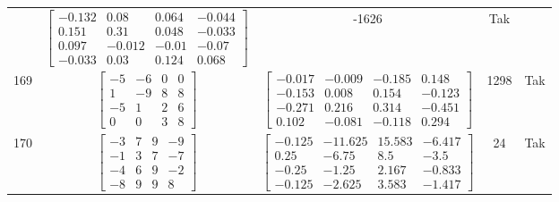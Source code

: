 \documentclass[a4paper,12pt]{article}
\begin{document}
\begin{tabular}{c c c c c}
&
$\begin{bmatrix} -0.132 & 0.08 & 0.064 & -0.044 \\ 0.151 & 0.31 & 0.048 & -0.033 \\ 0.097 & -0.012 & -0.01 & -0.07 \\ -0.033 & 0.03 & 0.124 & 0.068 \end{bmatrix}$
&
-1626
&
Tak
\\
169
&
$\begin{bmatrix} -5 & -6 & 0 & 0 \\ 1 & -9 & 8 & 8 \\ -5 & 1 & 2 & 6 \\ 0 & 0 & 3 & 8 \end{bmatrix}$
&
$\begin{bmatrix} -0.017 & -0.009 & -0.185 & 0.148 \\ -0.153 & 0.008 & 0.154 & -0.123 \\ -0.271 & 0.216 & 0.314 & -0.451 \\ 0.102 & -0.081 & -0.118 & 0.294 \end{bmatrix}$
&
1298
&
Tak
\\
170
&
$\begin{bmatrix} -3 & 7 & 9 & -9 \\ -1 & 3 & 7 & -7 \\ -4 & 6 & 9 & -2 \\ -8 & 9 & 9 & 8 \end{bmatrix}$
&
$\begin{bmatrix} -0.125 & -11.625 & 15.583 & -6.417 \\ 0.25 & -6.75 & 8.5 & -3.5 \\ -0.25 & -1.25 & 2.167 & -0.833 \\ -0.125 & -2.625 & 3.583 & -1.417 \end{bmatrix}$
&
24
&
Tak
\\
\end{tabular} \egroup \newpage
\end{document}
